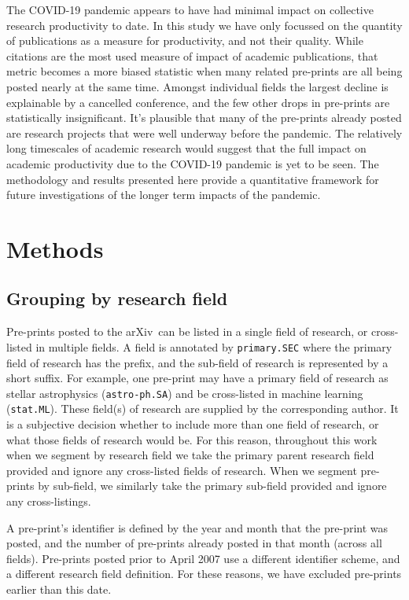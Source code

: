 \documentclass[]{rsos}%
\newcommand{\arxiv}{arXiv}
\begin{document}
The COVID-19 pandemic appears to have had minimal impact on collective research productivity to date. In this study we have only focussed on the quantity of publications as a measure for productivity, and not their quality. While citations are the most used measure of impact of academic publications, that metric becomes a more biased statistic when many related pre-prints are all being posted nearly at the same time\cite{Fassin:2021}. Amongst individual fields the largest decline is explainable by a cancelled conference, and the few other drops in pre-prints are statistically insignificant. It's plausible that many of the pre-prints already posted are research projects that were well underway before the pandemic. The relatively long timescales of academic research would suggest that the full impact on academic productivity due to the COVID-19 pandemic is yet to be seen. The methodology and results presented here provide a quantitative framework for future investigations of the longer term impacts of the pandemic.


\section*{Methods}

\subsection*{Grouping by research field}

Pre-prints posted to the \arxiv\ can be listed in a single field of research, or cross-listed in multiple fields. A field is annotated by \texttt{primary.SEC} where the primary field of research has the prefix, and the sub-field of research is represented by a short suffix. For example, one pre-print may have a primary field of research as stellar astrophysics (\texttt{astro-ph.SA}) and be cross-listed in machine learning (\texttt{stat.ML}). These field(s) of research are supplied by the corresponding author. It is a subjective decision whether to include more than one field of research, or what those fields of research would be. For this reason, throughout this work when we segment by research field we take the primary parent research field provided and ignore any cross-listed fields of research. When we segment pre-prints by sub-field, we similarly take the primary sub-field provided and ignore any cross-listings.

A pre-print's identifier is defined by the year and month that the pre-print was posted, and the number of pre-prints already posted in that month (across all fields). Pre-prints posted prior to April 2007 use a different identifier scheme, and a different research field definition. For these reasons, we have excluded pre-prints earlier than this date. 
\end{document}
